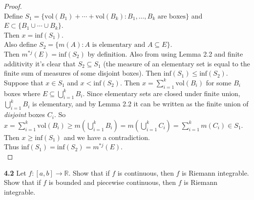 \documentclass[12pt]{article}
\begin{document}
	\begin{proof}  \text{ }\\
		Define $S_1 =  \{\text{vol}(B_1)+\cdots+\text{vol}(B_k) : B_1,\ldots,B_k  \text{ are boxes} \}$ and $E\subset \{B_1\cup\cdots\cup B_k\}$. \\
		Then $x = \text{inf}(S_1)$. \\
		Also define $S_2 = \{m(A) : A \text{ is elementary and } A \subseteq E \}$. \\
		Then $m^{*j}(E) = \text{inf}(S_2)$ by definition. Also from using Lemma 2.2 and finite additivity it's clear that $S_2 \subseteq S_1$ (the measure of an elementary set is equal to the finite sum of measures of some disjoint boxes). Then $\text{inf}(S_1) \leq \text{inf}(S_2)$.\\
		
		Suppose that $x \in S_1$ and $ x < \text{inf}(S_2)$. Then $x = \sum\limits_{i=1}^k \text{vol}(B_i)$ for some $B_i$ boxes where $E \subseteq \bigcup\limits_{i=1}^{k}B_i$. Since elementary sets are closed under finite union,  $\bigcup\limits_{i=1}^{k}B_i$ is elementary, and by Lemma 2.2 it can be written as the finite union of \textit{disjoint} boxes $C_i$. So $x = \sum\limits_{i=1}^k \text{vol}(B_i) \geq m(\bigcup\limits_{i=1}^{k}B_i) = m(\bigcup\limits_{i=1}^{k}C_i) = \sum\limits_{i=1}^{k}m(C_i) \in S_1$. Then $x \geq \text{inf}(S_1)$ and we have a contradiction. \\
		Thus $\text{inf}(S_1) = \text{inf}(S_2) = m^{*j}(E)$. \\ 
	\end{proof}



\hspace{-4 ex}\textbf{4.2} Let $f\colon[a,b]\to\mathbb{R}$. Show that if $f$ is continuous, then $f$ is Riemann integrable. Show that if $f$ is bounded and piecewise continuous, then $f$ is Riemann integrable. \bigbreak
\end{document}
